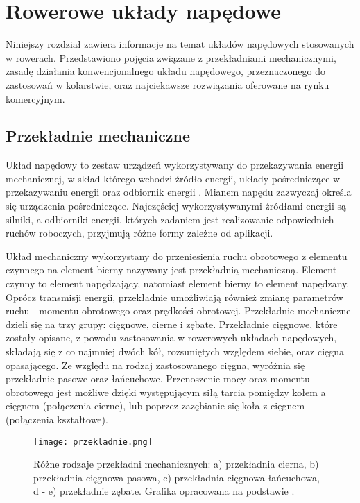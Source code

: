 \chapter{Rowerowe układy napędowe}

Niniejszy rozdział zawiera informacje na temat układów napędowych stosowanych w rowerach. Przedstawiono pojęcia związane z przekładniami mechanicznymi, zasadę działania konwencjonalnego układu napędowego, przeznaczonego do zastosowań w kolarstwie, oraz najciekawsze rozwiązania oferowane na rynku komercyjnym.
\section{Przekładnie mechaniczne}
Układ napędowy to zestaw urządzeń wykorzystywany do przekazywania energii mechanicznej, w skład którego wchodzi źródło energii, układy pośredniczące w przekazywaniu energii oraz odbiornik energii \cite{maszyny1}. Mianem napędu zazwyczaj określa się urządzenia pośredniczące. Najczęściej wykorzystywanymi źródłami energii są silniki, a odbiorniki energii, których zadaniem jest realizowanie odpowiednich ruchów roboczych, przyjmują różne formy zależne od aplikacji.

Układ mechaniczny wykorzystany do przeniesienia ruchu obrotowego z elementu czynnego na element bierny nazywany jest przekładnią mechaniczną. Element czynny to element napędzający, natomiast element bierny to element napędzany. Oprócz transmisji energii, przekładnie umożliwiają również zmianę parametrów ruchu - momentu obrotowego oraz prędkości obrotowej. Przekładnie mechaniczne dzieli się na trzy grupy: cięgnowe, cierne i zębate. Przekładnie cięgnowe, które zostały opisane, z powodu zastosowania w rowerowych układach napędowych, składają się z co najmniej dwóch kół, rozsuniętych względem siebie, oraz cięgna opasającego. Ze względu na rodzaj zastosowanego cięgna, wyróżnia się przekładnie pasowe oraz łańcuchowe. Przenoszenie mocy oraz momentu obrotowego jest możliwe dzięki występującym siłą tarcia pomiędzy kołem a cięgnem (połączenia cierne), lub poprzez zazębianie się koła z cięgnem (połączenia kształtowe).
\begin{figure}[h]
    \centering
    \texttt{[image: przekladnie.png]}
    \caption{Różne rodzaje przekładni mechanicznych: a) przekładnia cierna, b) przekładnia cięgnowa pasowa, c) przekładnia cięgnowa łańcuchowa, d - e) przekładnie zębate. Grafika opracowana na podstawie \cite{maszyny1}.}
    \label{fig:przekladnia}
\end{figure}

